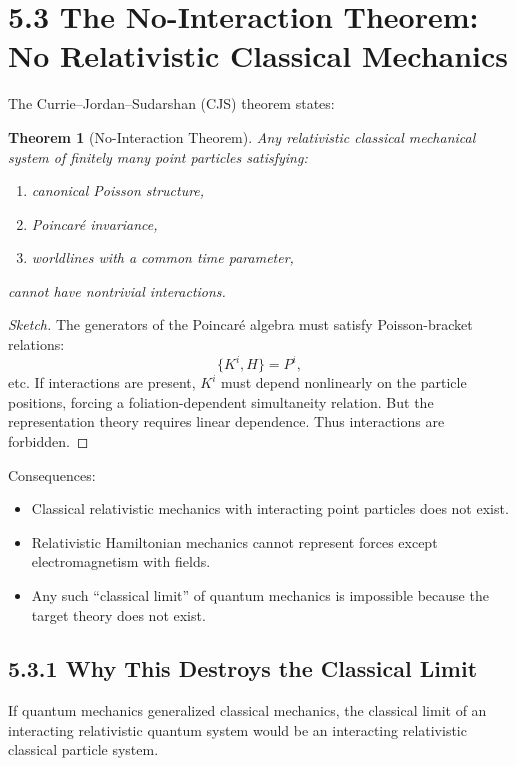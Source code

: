 \documentclass[12pt,oneside]{book}
\theoremstyle{plain}
\newtheorem{theorem}{Theorem}[chapter]
\theoremstyle{definition}
\begin{document}
\section{5.3 The No-Interaction Theorem: No Relativistic Classical Mechanics}

The Currie–Jordan–Sudarshan (CJS) theorem states:

\begin{theorem}[No-Interaction Theorem]
Any relativistic classical mechanical system of finitely many point particles  
satisfying:
\begin{enumerate}
\item canonical Poisson structure,
\item Poincaré invariance,
\item worldlines with a common time parameter,
\end{enumerate}
cannot have nontrivial interactions.
\end{theorem}

\begin{proof}[Sketch]
The generators of the Poincaré algebra must satisfy Poisson-bracket relations:
\[
\{K^i,H\} = P^i,
\]
etc.  
If interactions are present, $K^i$ must depend nonlinearly on the particle positions, forcing a foliation-dependent simultaneity relation.  
But the representation theory requires linear dependence.  
Thus interactions are forbidden.
\end{proof}

Consequences:

\begin{itemize}
\item Classical relativistic mechanics with interacting point particles does not exist.  
\item Relativistic Hamiltonian mechanics cannot represent forces except electromagnetism with fields.  
\item Any such “classical limit” of quantum mechanics is impossible because the target theory does not exist.
\end{itemize}

\subsection{5.3.1 Why This Destroys the Classical Limit}

If quantum mechanics generalized classical mechanics, the classical limit of an interacting relativistic quantum system would be an interacting relativistic classical particle system.
\end{document}
